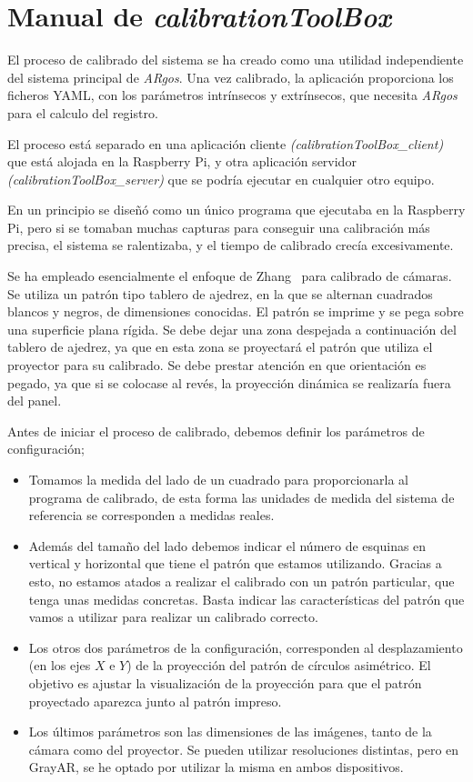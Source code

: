 \chapter{Manual de \textit{calibrationToolBox}}

El proceso de calibrado del sistema se ha creado como una utilidad independiente del sistema principal de \textit{ARgos}. Una vez calibrado, la aplicación proporciona los ficheros YAML, con los parámetros intrínsecos y extrínsecos, que necesita \textit{ARgos} para el calculo del registro.

El proceso está separado en una aplicación cliente \textit{(calibrationToolBox\_client)} que está alojada en la Raspberry Pi, y otra aplicación servidor \textit{(calibrationToolBox\_server)} que se podría ejecutar en cualquier otro equipo.

En un principio se diseñó como un único programa que ejecutaba en la Raspberry Pi, pero si se tomaban muchas capturas para conseguir una calibración más precisa, el sistema se ralentizaba, y el tiempo de calibrado crecía excesivamente.  

Se ha empleado esencialmente el enfoque de Zhang~\cite{Zhang} para calibrado de cámaras. Se utiliza un patrón tipo tablero de ajedrez, en la que se alternan cuadrados blancos y negros, de dimensiones conocidas. El patrón se imprime y se pega sobre una superficie plana rígida. Se debe dejar una zona despejada a continuación del tablero de ajedrez, ya que en esta zona se proyectará el patrón que utiliza el proyector para su calibrado. Se debe prestar atención en que orientación es pegado, ya que si se colocase al revés, la proyección dinámica se realizaría fuera del panel.

Antes de iniciar el proceso de calibrado, debemos definir los parámetros de configuración;

\begin{itemize} 
\item Tomamos la medida del lado de un cuadrado para proporcionarla al programa de calibrado, de esta forma las unidades de medida del sistema de referencia se corresponden a medidas reales. 

\item Además del tamaño del lado debemos indicar el número de esquinas en vertical y horizontal que tiene el patrón que estamos utilizando. Gracias a esto, no estamos atados a realizar el calibrado con un patrón particular, que tenga unas medidas concretas. Basta indicar las características del patrón que vamos a utilizar para realizar un calibrado correcto.

\item Los otros dos parámetros de la configuración, corresponden al desplazamiento (en los ejes $X$ e $Y$) de la proyección del patrón de círculos asimétrico. El objetivo es ajustar la visualización de la proyección para que el patrón proyectado aparezca junto al patrón impreso. 

\item Los últimos parámetros son las dimensiones de las imágenes, tanto de la cámara como del proyector. Se pueden utilizar resoluciones distintas, pero en GrayAR, se he optado por utilizar la misma en ambos dispositivos.  
\end{itemize}

